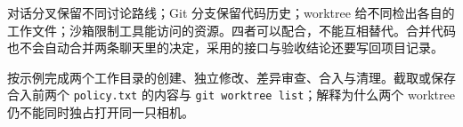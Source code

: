 \begin{conclusion}
对话分叉保留不同讨论路线；Git 分支保留代码历史；worktree 给不同检出各自的工作文件；沙箱限制工具能访问的资源。四者可以配合，不能互相替代。合并代码也不会自动合并两条聊天里的决定，采用的接口与验收结论还要写回项目记录。
\end{conclusion}

\begin{exercise}\label{ex:ai-workflow-worktree}
按示例完成两个工作目录的创建、独立修改、差异审查、合入与清理。截取或保存合入前两个 \texttt{policy.txt} 的内容与 \texttt{git worktree list}；解释为什么两个 worktree 仍不能同时独占打开同一只相机。
\end{exercise}
